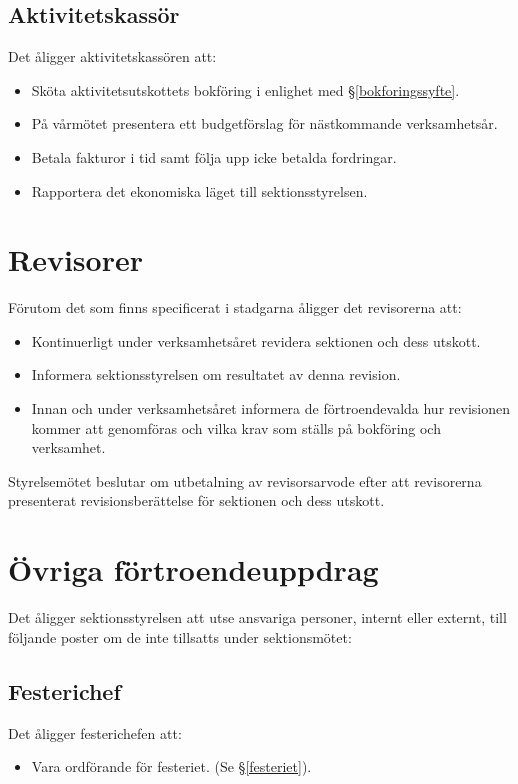 \documentclass{datateknologsektionen-document}
\begin{document}
\subsection{Aktivitetskassör}
\label{aktukassor}
Det åligger aktivitetskassören att:
\begin{itemize}
  \item Sköta aktivitetsutskottets bokföring i enlighet med \S \ref{bokforingssyfte}.
  \item På vårmötet presentera ett budgetförslag för nästkommande verksamhetsår.
  \item Betala fakturor i tid samt följa upp icke betalda fordringar.
  \item Rapportera det ekonomiska läget till sektionsstyrelsen.
\end{itemize}
\section{Revisorer}
Förutom det som finns specificerat i stadgarna åligger det revisorerna att:
\begin{itemize}
  \item Kontinuerligt under verksamhetsåret revidera sektionen och dess utskott.
  \item Informera sektionsstyrelsen om resultatet av denna revision.
  \item Innan och under verksamhetsåret informera de förtroendevalda hur revisionen kommer att genomföras och vilka krav som ställs på bokföring och verksamhet.
\end{itemize}
Styrelsemötet beslutar om utbetalning av revisorsarvode efter att revisorerna presenterat
revisionsberättelse för sektionen och dess utskott.

\section{Övriga förtroendeuppdrag}

Det åligger sektionsstyrelsen att utse ansvariga personer, internt eller externt, till följande poster
om de inte tillsatts under sektionsmötet:
\subsection{Festerichef}
Det åligger festerichefen att:
\begin{itemize}
  \item Vara ordförande för festeriet. (Se \S \ref{festeriet}).
\end{itemize}
\end{document}
